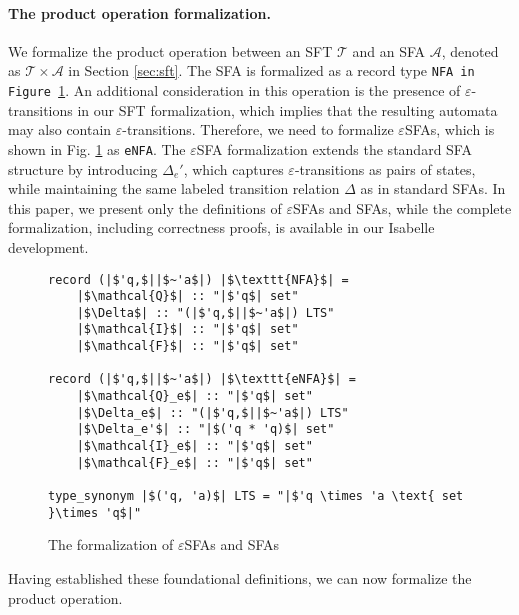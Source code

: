 \paragraph{The product operation formalization.} We formalize the product operation between an SFT $\mathcal{T}$ and an SFA $\mathcal{A}$, denoted as $\mathcal{T} \times \mathcal{A}$ in Section \ref{sec:sft}. The SFA is formalized as a record type \texttt{NFA in Figure \ref{fig-def-FAs}}.
An additional consideration in this operation is the presence of $\varepsilon$-transitions in our SFT formalization, which implies that the resulting automata may also contain $\varepsilon$-transitions.
%
Therefore, we need to formalize $\varepsilon$SFAs, which is shown in Fig. \ref{fig-def-FAs} as \texttt{eNFA}. The $\varepsilon$SFA formalization extends the standard SFA structure by introducing $\Delta_e'$, which captures $\varepsilon$-transitions as pairs of states, while maintaining the same labeled transition relation $\Delta$ as in standard SFAs.
In this paper, we present only the definitions of  $\varepsilon$SFAs and SFAs, while the complete formalization, including correctness proofs, is available in our Isabelle development.

\begin{figure}[hbt!]
	\begin{lstlisting}
record (|$'q,$||$~'a$|) |$\texttt{NFA}$| =
	|$\mathcal{Q}$| :: "|$'q$| set"
	|$\Delta$| :: "(|$'q,$||$~'a$|) LTS"
	|$\mathcal{I}$| :: "|$'q$| set"
	|$\mathcal{F}$| :: "|$'q$| set"

record (|$'q,$||$~'a$|) |$\texttt{eNFA}$| =
	|$\mathcal{Q}_e$| :: "|$'q$| set"
	|$\Delta_e$| :: "(|$'q,$||$~'a$|) LTS"
	|$\Delta_e'$| :: "|$('q * 'q)$| set"
	|$\mathcal{I}_e$| :: "|$'q$| set"
	|$\mathcal{F}_e$| :: "|$'q$| set"

type_synonym |$('q, 'a)$| LTS = "|$'q \times 'a \text{ set }\times 'q$|"    
	\end{lstlisting}
\caption{The formalization of $\varepsilon$SFAs and SFAs}
\label{fig-def-FAs}
\end{figure}


Having established these foundational definitions, we can now formalize the product operation. 

